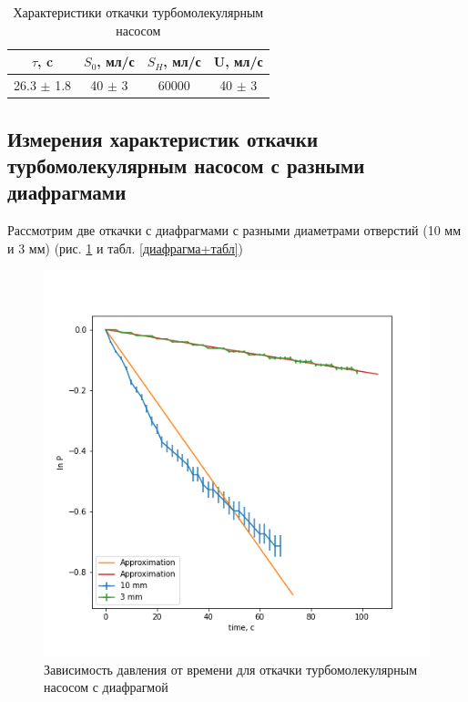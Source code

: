 \documentclass[a4paper,12pt]{article} %
\begin{document}
\begin{table}
\caption{Характеристики откачки турбомолекулярным насосом}
\label{откачка+тмн}
\begin{tabular}{|c|c|c|c|}
\hline 
$\tau$, c & $S_0$, мл/с& $S_H$, мл/с& U, мл/с  \\ 
\hline 
26.3 $\pm$ 1.8 & 40 $\pm$ 3 & 60000 & 40 $\pm$ 3\\ 
\hline  
\end{tabular} 
\end{table}


\subsection{Измерения характеристик откачки турбомолекулярным насосом с разными диафрагмами}
Рассмотрим две откачки с диафрагмами с разными диаметрами отверстий (10 мм и 3 мм) (рис. \ref{диафрагма+график} и табл. \ref{диафрагма+табл})

\begin{figure}[h!]
\begin{center}
\includegraphics[width=\textwidth]{ТМН+диафрагма.png}
\end{center}
\caption{Зависимость давления от времени для откачки турбомолекулярным насосом с диафрагмой} \label{диафрагма+график}
\end{figure}
\end{document}
